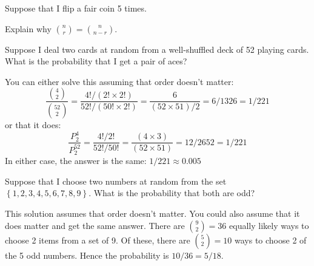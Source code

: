 \documentclass[addpoints,12pt]{exam}
\begin{document}
\begin{questions}

\question Suppose that I flip a fair coin 5 times.

\question Explain why $\displaystyle{n \choose r} = {n \choose n-r}$.

\question Suppose I deal two cards at random from a well-shuffled deck of 52 playing cards. What is the probability that I get a pair of aces? 
	\begin{solution}
	You can either solve this assuming that order doesn't matter:
		$$\frac{\binom{4}{2}}{\binom{52}{2}} = \frac{4!/(2!\times 2!)}{52!/(50!  \times 2!)} = \frac{6}{(52\times 51)/2}= 6/1326 = 1/221$$
		or that it does:
		$$\frac{P^4_2}{P^{52}_2} = \frac{4!/2!}{52!/50!} =\frac{(4\times 3)}{(52\times 51)} = 12/2652 = 1/221$$
		In either case, the answer is the same: $1/221  \approx 0.005$
	\end{solution}

  \question Suppose that I choose two numbers at random from the set $\left\{ 1, 2, 3, 4, 5, 6, 7, 8, 9 \right\}$. What is the probability that both are odd?
  \begin{solution}
    This solution assumes that order doesn't matter.
    You could also assume that it does matter and get the same answer.
    There are $\displaystyle {9 \choose 2} = 36$ equally likely ways to choose 2 items from a set of 9. Of these, there are $\displaystyle {5 \choose 2} = 10$ ways to choose 2 of the 5 odd numbers.
    Hence the probability is $10/36 = 5/18$.
  \end{solution}


\end{questions}
\end{document}
